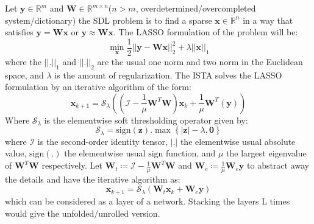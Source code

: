 Let $\boldsymbol{y} \in \mathbb{R}^m$ and $\boldsymbol{W} \in \mathbb{R}^{m \times n}$($n > m$, overdetermined/overcompleted system/dictionary)
the \ac{SDL} problem is to find a sparse $\boldsymbol{x} \in \mathbb{R}^n$ in a way that satisfies $\boldsymbol{y} = \boldsymbol{W}\boldsymbol{x}$ or $\boldsymbol{y} \approx \boldsymbol{W}\boldsymbol{x}$.
The \ac{LASSO}\cite{Hastie2009} formulation of the problem will be:
\begin{equation*}
  \min_{\boldsymbol{x}} \frac{1}{2} \left|\left|\boldsymbol{y}-\boldsymbol{W}\boldsymbol{x}\right|\right|_2^2 + \lambda \left|\left|\boldsymbol{x}\right|\right|_1
\end{equation*}
where the $\left|\left|\boldsymbol{.}\right|\right|_1$ and $\left|\left|\boldsymbol{.}\right|\right|_2$ are the usual one norm\cite{Alt2016} and two norm\cite{alt} in the Euclidean space, and $\lambda$ is the amount of regularization\cite{Hastie2009}. 
The \ac{ISTA}\cite{Daubechies2003} solves the \ac{LASSO} formulation by an iterative algorithm of the form:
\begin{equation*}
  \boldsymbol{x}_{k+1} = \mathcal{S}_\lambda\left(\left(\mathcal{I}-\frac{1}{\mu}\boldsymbol{W}^T\boldsymbol{W}\right)\boldsymbol{x}_k+\frac{1}{\mu}\boldsymbol{W}^T\left(\boldsymbol{y}\right)\right)
\end{equation*}
Where $\mathcal{S}_\lambda$ is the elementwise soft thresholding operator given by:
\begin{equation*}
  \mathcal{S}_\lambda = \mathrm{sign}(\boldsymbol{z}) \boldsymbol{.} \max \left\{\left|\boldsymbol{z}\right|-\lambda,\boldsymbol{0}\right\}
\end{equation*}
where $\mathcal{I}$ is the second-order identity tensor, $\left|\boldsymbol{.}\right|$ the elementwise usual absolute value, 
$\mathrm{sign}(\boldsymbol{.})$ the elementwise usual $\mathrm{sign}$ function, and $\mu$ the largest eigenvalue 
 of $\boldsymbol{W}^T\boldsymbol{W}$ respectively.
Let $\boldsymbol{W}_t \coloneqq \mathcal{I}-\frac{1}{\mu}\boldsymbol{W}^T\boldsymbol{W}$ and 
$\boldsymbol{W}_e \coloneqq \frac{1}{\mu}\boldsymbol{W}_e\boldsymbol{y}$ to abstract away the details and have the iterative algorithm 
as:
\begin{equation*}
  \boldsymbol{x}_{k+1} = \mathcal{S}_\lambda\left(\boldsymbol{W}_t\boldsymbol{x}_{k}+\boldsymbol{W}_e\boldsymbol{y}\right)
\end{equation*}
which can be considered as a layer of a network. Stacking the layers $\mathrm{L}$ times would give the unfolded/unrolled version.

